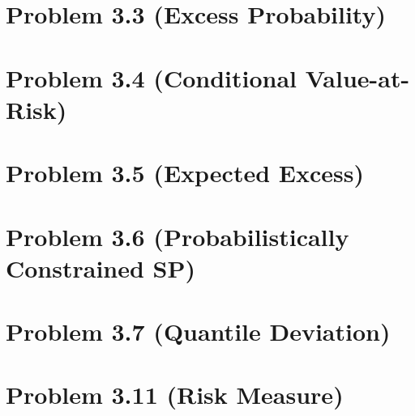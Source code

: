 \documentclass[10pt]{article}
\begin{document}
\section{Problem 3.3 (Excess Probability)}

\section{Problem 3.4 (Conditional Value-at-Risk)}

\section{Problem 3.5 (Expected Excess)}

\section{Problem 3.6 (Probabilistically Constrained SP)}

\section{Problem 3.7 (Quantile Deviation)}

\section{Problem 3.11 (Risk Measure)}
\end{document}
